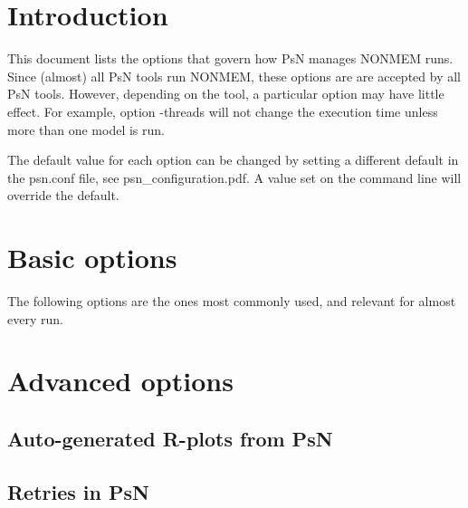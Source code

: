 



\maketitle
\newcommand{\guidetoolname}{<toolname>}

\section{Introduction}
This document lists the options that govern how PsN manages NONMEM runs. Since (almost) all PsN tools run NONMEM, these options are 
are accepted by all PsN tools. However, depending on the tool, a particular option may have little effect. For example, option -threads will not change the execution time unless more than one model is run. 

The default value for each option can be changed by setting a different default in the psn.conf file, see psn\_configuration.pdf. A value set on the command line will override the default.

\section{Basic options}
The following options are the ones most commonly used, and relevant for almost every run.


\section{Advanced options}
\subsection{Auto-generated R-plots from PsN}
\newcommand{\rplotsconditions}{
Most default templates depend on a couple of R libraries. The R-scripts subdirectory contains, in addition to all the default templates, a script required\_packages.R that can be run to install all the packages used by one or more of the default templates.
If the required R libraries for a particular template are not installed then no pdf will be generated. Check the .Rout file in the main run directory for error messages.
}


\subsection{Retries in PsN}


